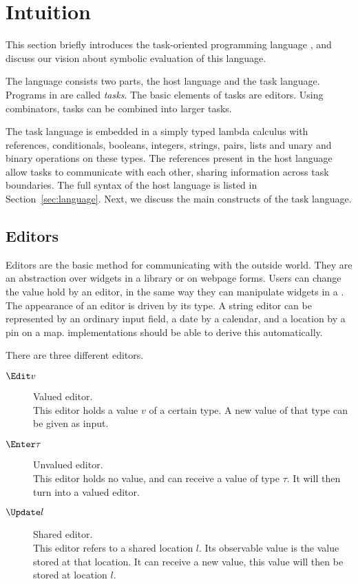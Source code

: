 
\section{Intuition}
\label{sec:intuition}

This section briefly introduces the task-oriented programming language \TOPHAT,
and discuss our vision about symbolic evaluation of this language.

The \TOPHAT language consists two parts, the host language and the task language.
Programs in \TOPHAT are called \emph{tasks}.
The basic elements of tasks are editors.
Using combinators, tasks can be combined into larger tasks.

The task language is embedded in a simply typed lambda calculus with references, conditionals, booleans, integers, strings, pairs, lists and unary and binary operations on these types.
The references present in the host language allow tasks to communicate with each other, sharing information across task boundaries.
The full syntax of the host language is listed in Section~\ref{sec:language}.
Next, we discuss the main constructs of the task language.


\subsection{Editors}

Editors are the basic method for communicating with the outside world.
They are an abstraction over widgets in a \GUI library or on webpage forms.
Users can change the value hold by an editor,
in the same way they can manipulate widgets in a \GUI.
The appearance of an editor is driven by its type.
A string editor can be represented by an ordinary input field,
a date by a calendar, and a location by a pin on a map.
\TOP implementations should be able to derive this automatically.

There are three different editors.
\begin{description}
  \item[$\Edit v$] Valued editor.\\
    This editor holds a value $v$ of a certain type.
    A new value of that type can be given as input.
  \item[$\Enter \tau$] Unvalued editor.\\
    This editor holds no value, and can receive a value of type $\tau$.
    It will then turn into a valued editor.
  \item[$\Update l$] Shared editor.\\
    This editor refers to a shared location $l$.
    Its observable value is the value stored at that location.
    It can receive a new value, this value will then be stored at location $l$.
\end{description}



